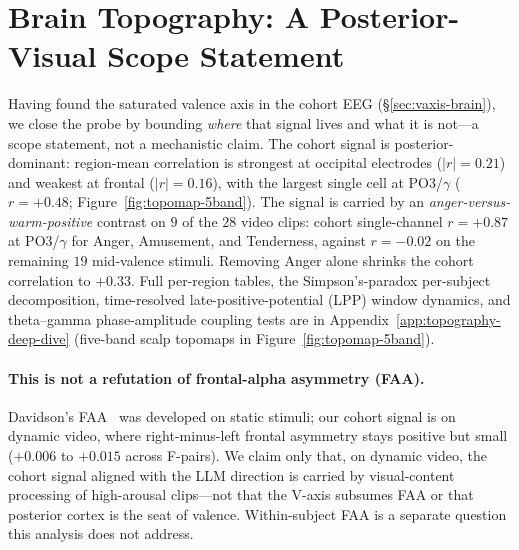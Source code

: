 \section{Brain Topography: A Posterior-Visual Scope Statement}
\label{sec:topography}

Having found the saturated valence axis in the cohort EEG
(\S\ref{sec:vaxis-brain}), we close the probe by bounding \emph{where}
that signal lives and what it is not---a scope statement, not a
mechanistic claim.
The cohort signal is posterior-dominant: region-mean correlation is
strongest at occipital electrodes ($|r|=0.21$) and weakest at frontal
($|r|=0.16$), with the largest single cell at PO3/$\gamma$ ($r=+0.48$;
Figure~\ref{fig:topomap-5band}). The signal is carried by an
\emph{anger-versus-warm-positive} contrast on $9$ of the $28$ video
clips: cohort single-channel $r{=}+0.87$ at PO3/$\gamma$ for Anger, Amusement, and
Tenderness, against $r{=}-0.02$ on the remaining $19$ mid-valence
stimuli. Removing Anger alone shrinks the cohort correlation to
$+0.33$. Full per-region tables, the Simpson's-paradox per-subject
decomposition, time-resolved late-positive-potential (LPP) window dynamics, and theta--gamma
phase-amplitude coupling tests are in
Appendix~\ref{app:topography-deep-dive} (five-band scalp topomaps in
Figure~\ref{fig:topomap-5band}).

\paragraph{This is not a refutation of frontal-alpha asymmetry
(FAA).} Davidson's FAA~\citep{davidson1992anterior,coan2004frontal} was
developed on static stimuli; our cohort signal is on dynamic video,
where right-minus-left frontal asymmetry stays positive but small
($+0.006$ to $+0.015$ across F-pairs). We claim only that, on dynamic
video, the cohort signal aligned with the LLM direction is carried by
visual-content processing of high-arousal clips---not that the V-axis
subsumes FAA or that posterior cortex is the seat of valence.
Within-subject FAA is a separate question this analysis does not
address.
